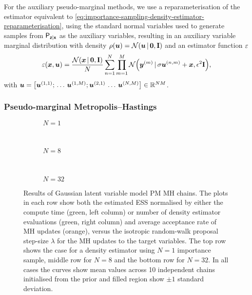 For the auxiliary pseudo-marginal methods, we use a reparameterisation of the estimator equivalent to \eqref{eq:importance-sampling-density-estimator-reparameterisation}, using the standard normal variables used to generate samples from $\mathsf{P}_{\boldsymbol{\mathsf{z}}|\boldsymbol{\mathsf{x}}}$ as the auxiliary variables, resulting in an auxiliary variable marginal distribution with density $\rho(\vct{u}) = \nrm{\vct{u}\gvn\vct{0},\mathbf{I}}$ and an estimator function $\varepsilon$
\begin{equation}
  \esttgtdens(\vct{x},\vct{u}) =
  \frac{\nrm{\vct{x} \gvn \vct{0},\mathbf{I}}}{N} \sum_{n=1}^N 
  \prod_{m=1}^M \nrm{\vct{y}^{(m)} \gvn \sigma \vct{u}^{(n,m)} + \vct{x}, \epsilon^2\mathbf{I}},
\end{equation}
with $\vct{u} = \lsb \vct{u}^{(1,1)}; \,\dots\, \vct{u}^{(1,M)}; \vct{u}^{(2,1)}\,\dots\,\vct{u}^{(N,M)}\rsb \in \reals^{NM}$.

\subsubsection{Pseudo-marginal Metropolis--Hastings}

\begin{figure}
\centering
\begin{subfigure}[b]{\linewidth}
\centering
  \caption{$N=1$}
  \label{sfig:pm-mh-1-gaussian-latent}
\end{subfigure}
\\[3mm]
\begin{subfigure}[b]{\linewidth}
\centering
  \caption{$N=8$}
  \label{sfig:pm-mh-8-gaussian-latent}
\end{subfigure}
\\[3mm]
\begin{subfigure}[b]{\linewidth}
\centering
  \caption{$N=32$}
  \label{sfig:pm-mh-32-gaussian-latent}
\end{subfigure}
\caption[\acs{PM} \acs{MH} Gaussian model results.]{
Results of Gaussian latent variable model \ac{PM} \acs{MH} chains. The plots in each row show both the estimated \ac{ESS} normalised by either the compute time (green, left column) or number of density estimator evaluations (green, right column) and average acceptance rate of \ac{MH} updates (orange), versus the isotropic random-walk proposal step-size $\lambda$ for the \ac{MH} updates to the target variables. The top row shows the case for a density estimator using $N=1$ importance sample, middle row for $N=8$ and the bottom row for $N=32$. In all cases the curves show mean values across 10 independent chains initialised from the prior and filled region show $\pm 1$ standard deviation.}
\label{fig:pmmh-gaussian-latent-results}
\end{figure}

